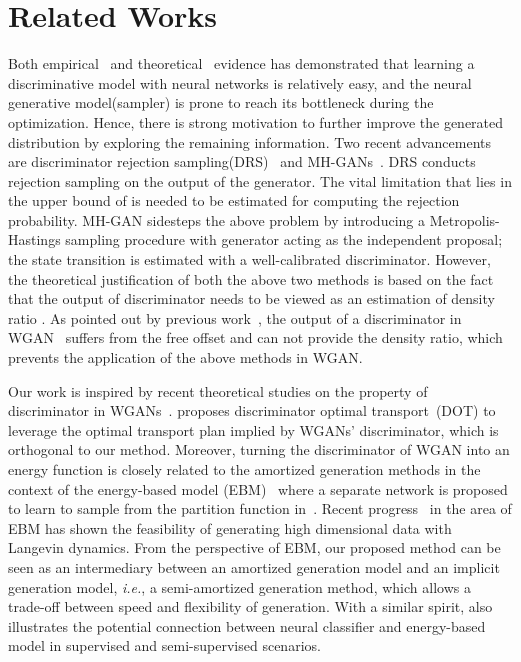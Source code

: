 \documentclass{article}
\begin{document}
\section{Related Works}
Both empirical~\cite{arjovsky2017wasserstein} and theoretical~\cite{heusel2017gans} evidence has demonstrated that learning a discriminative model with neural networks is relatively easy, and the neural generative model(sampler) is prone to reach its bottleneck during the optimization. Hence, there is strong motivation to further improve the generated distribution by exploring the remaining information. Two recent advancements are discriminator rejection sampling(DRS)~\cite{azadi2018discriminator} and MH-GANs~\cite{turner2018metropolis}. DRS conducts rejection sampling on the output of the generator. The vital limitation that lies in the upper bound of  is needed to be estimated for computing the rejection probability. MH-GAN sidesteps the above problem by introducing a Metropolis-Hastings sampling procedure with generator acting as the independent proposal; the state transition is estimated with a well-calibrated discriminator. However, the theoretical justification of both the above two methods is based on the fact that the output of discriminator needs to be viewed as an estimation of density ratio . As pointed out by previous work~\cite{zhou2019lipschitz}, the output of a discriminator in WGAN~\cite{arjovsky2017wasserstein} suffers from the free offset and can not provide the density ratio, which prevents the application of the above methods in WGAN. 

Our work is inspired by recent theoretical studies on the property of discriminator in WGANs~\cite{gulrajani2017improved,zhou2019lipschitz}. \cite{tanaka2019discriminator} proposes discriminator optimal transport~(DOT) to leverage the optimal transport plan implied by WGANs' discriminator, which is orthogonal to our  method. 
Moreover, turning the discriminator of WGAN into an energy function is closely related to the amortized generation methods in the context of the energy-based model (EBM)~\cite{kim2016deep,zhao2016energy,kumar2019maximum} where a separate network is proposed to learn to sample from the partition function in~\cite{finn2016connection}. Recent progress~\cite{song2019generative,du2019implicit} in the area of EBM has shown the feasibility of generating high dimensional data with Langevin dynamics. From the perspective of EBM, our proposed method can be seen as an intermediary between an amortized generation model and an implicit generation model, \emph{i.e.}, a semi-amortized generation method, which allows a trade-off between speed and flexibility of generation.  With a similar spirit, \cite{grathwohl2019your}  also illustrates the potential connection between neural classifier and energy-based model in supervised and semi-supervised scenarios.  
\end{document}
